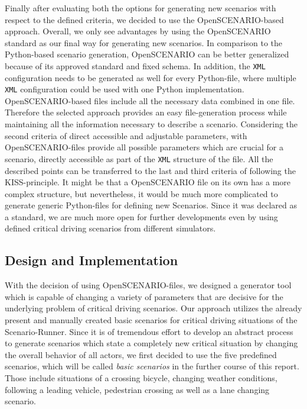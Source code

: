 \documentclass[conference, a4paper, 11pt]{IEEEtran}
\begin{document}
Finally after evaluating both the options for generating new scenarios with respect to the defined criteria, we decided to use the OpenSCENARIO-based approach. Overall, we only see advantages by using the OpenSCENARIO standard as our final way for generating new scenarios. In comparison to the Python-based scenario generation, OpenSCENARIO can be better generalized because of its approved standard and fixed schema. In addition, the \texttt{XML} configuration needs to be generated as well for every Python-file, where multiple \texttt{XML} configuration could be used with one Python implementation. OpenSCENARIO-based files include all the necessary data combined in one file. Therefore the selected approach provides an easy file-generation process while maintaining all the information necessary to describe a scenario. Considering the second criteria of direct accessible and adjustable parameters, with OpenSCENARIO-files provide all possible parameters which are crucial for a scenario, directly accessible as part of the \texttt{XML} structure of the file.
All the described points can be transferred to the last and third criteria of following the KISS-principle. It might be that a OpenSCENARIO file on its own has a more complex structure, but nevertheless, it would be much more complicated to generate generic Python-files for defining new Scenarios. Since it was declared as a standard, we are much more open for further developments even by using defined critical driving scenarios from different simulators.

\subsection{Design and Implementation}
With the decision of using OpenSCENARIO-files, we designed a generator tool which is capable of changing a variety of parameters that are decisive for the underlying problem of critical driving scenarios. Our approach utilizes the already present and manually created basic scenarios for critical driving situations of the Scenario-Runner. Since it is of tremendous effort to develop an abstract process to generate scenarios which state a completely new critical situation by changing the overall behavior of all actors, we first decided to use the five predefined scenarios, which will be called \textit{basic scenarios} in the further course of this report. Those include situations of a crossing bicycle,  changing weather conditions, following a leading vehicle, pedestrian crossing as well as a lane changing scenario.
\end{document}
